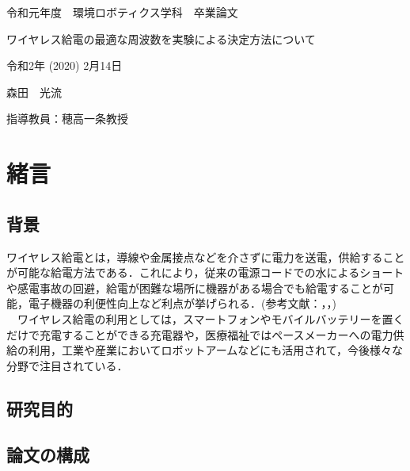 \documentclass[12pt]{jarticle}
\begin{document}
	
\thispagestyle{empty}

\vspace*{20mm}
\begin{center}
	{\Large 令和元年度　環境ロボティクス学科　卒業論文}
\end{center}
\vspace{10mm}
\begin{center}
	{\Huge ワイヤレス給電の最適な周波数を実験による決定方法について}
\end{center}
\vspace{90mm}
\begin{center}
	{\Large 令和2年 (2020) 2月14日}
\end{center}
\begin{center}
	{\Large 森田　光流}
\end{center}
\begin{center}
	{\Large 指導教員：穂高一条教授}
\end{center}

\clearpage

\tableofcontents

\clearpage

\section{緒言}
\subsection{背景}
ワイヤレス給電とは，導線や金属接点などを介さずに電力を送電，供給することが可能な給電方法である．これにより，従来の電源コードでの水によるショートや感電事故の回避，給電が困難な場所に機器がある場合でも給電することが可能，電子機器の利便性向上など利点が挙げられる．(参考文献：\cite{matuda}，\cite{nakamura}，\cite{rohm})\\　ワイヤレス給電の利用としては，スマートフォンやモバイルバッテリーを置くだけで充電することができる充電器や，医療福祉ではペースメーカーへの電力供給の利用，工業や産業においてロボットアームなどにも活用されて，今後様々な分野で注目されている．
　	
\subsection{研究目的}

\subsection{論文の構成}
\end{document}
